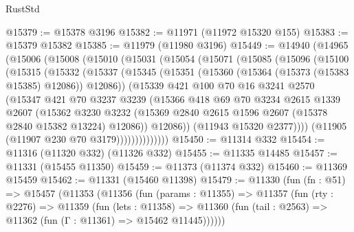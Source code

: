 \begin{lexlean}{RustStd}
\begin{coremodule}
@15379 := @15378 @3196
@15382 := @11971 (@11972 @15320 @155)
@15383 := @15379 @15382
@15385 := @11979 (@11980 @3196)
@15449 := @14940
    (@14965
      (@15006
        (@15008
          (@15010
            (@15031
              (@15054
                (@15071
                  (@15085
                    (@15096
                      (@15100
                        (@15315
                          (@15332
                            (@15337
                              (@15345
                                (@15351 (@15360 (@15364 (@15373 (@15383 @15385) @12086)) @12086))
                                (@15339
                                  @421
                                  @100
                                  @70
                                  @16
                                  @3241
                                  @2570
                                  (@15347
                                    @421
                                    @70
                                    @3237
                                    @3239
                                    (@15366
                                      @418
                                      @69
                                      @70
                                      @3234
                                      @2615
                                      @1339
                                      @2607
                                      (@15362
                                        @3230
                                        @3232
                                        (@15369
                                          @2840
                                          @2615
                                          @1596
                                          @2607
                                          (@15378 @2840 @15382 @13224)
                                          @12086))
                                      @12086))
                                  (@11943 @15320 @2377))))
                            (@11905 (@11907 @230 @70 @3179))))))))))))))
@15450 := @11314 @332
@15454 := @11316 (@11320 @332) (@11326 @332)
@15455 := @11335 @14485
@15457 := @11331 (@15455 @11350)
@15459 := @11373 (@11374 @332)
@15460 := @11369 @15459
@15462 := @11331 (@15460 @11398)
@15479 := @11330
    (fun (fn : @51) =>
    @15457
      (@11353
        (@11356
          (fun (params : @11355) =>
          @11357
            (fun (rty : @2276) =>
            @11359
              (fun (lets : @11358) =>
              @11360 (fun (tail : @2563) => @11362 (fun (Γ : @11361) => @15462 @11445))))))

\end{coremodule}
\end{lexlean}
